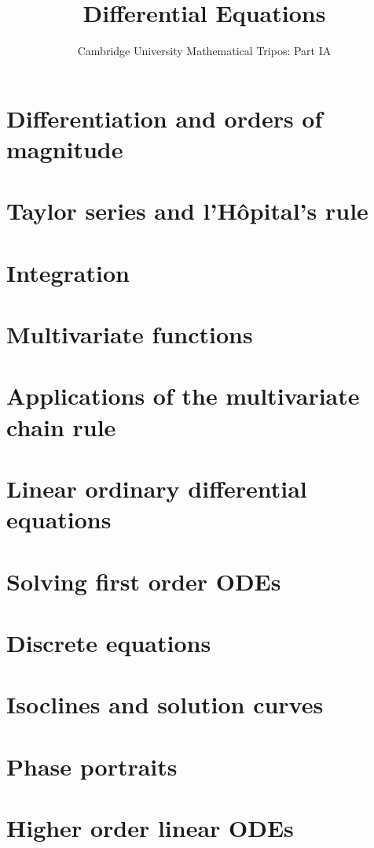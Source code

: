 \documentclass{article}
\title{Differential Equations}
\author{Cambridge University Mathematical Tripos: Part IA}
\begin{document}
\maketitle

\tableofcontentsnewpage{}

\section{Differentiation and orders of magnitude}

\section{Taylor series and l'H\^opital's rule}

\section{Integration}

\section{Multivariate functions}

\section{Applications of the multivariate chain rule}

\section{Linear ordinary differential equations}

\section{Solving first order ODEs}

\section{Discrete equations}

\section{Isoclines and solution curves}

\section{Phase portraits}

\section{Higher order linear ODEs}

\end{document}
